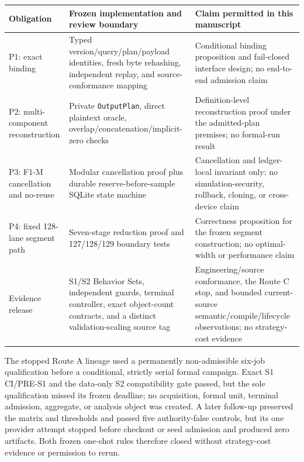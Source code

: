 {\small{} %
\begin{longtable}[]{@{}
  >{\raggedright\arraybackslash}p{}
  >{\raggedright\arraybackslash}p{}
  >{\raggedright\arraybackslash}p{}@{}}
\toprule\noalign{}
\begin{minipage}[b]{\linewidth}\raggedright
Obligation
\end{minipage} & \begin{minipage}[b]{\linewidth}\raggedright
Frozen implementation and review boundary
\end{minipage} & \begin{minipage}[b]{\linewidth}\raggedright
Claim permitted in this manuscript
\end{minipage} \\
\midrule\noalign{}
\endhead
\bottomrule\noalign{}
\endlastfoot
P1: exact binding & Typed version/query/plan/payload identities, fresh byte rehashing, independent replay, and source-conformance mapping & Conditional binding proposition and fail-closed interface design; no end-to-end admission claim \\
P2: multi-component reconstruction & Private \texttt{Output}\allowbreak\texttt{Plan}, direct plaintext oracle, overlap/\allowbreak concatenation/\allowbreak implicit-zero checks & Definition-level reconstruction proof under the admitted-plan premises; no formal-run result \\
P3: F1-M cancellation and no-reuse & Modular cancellation proof plus durable reserve-before-sample SQLite state machine & Cancellation and ledger-local invariant only; no simulation-security, rollback, cloning, or cross-device claim \\
P4: fixed 128-lane segment path & Seven-stage reduction proof and 127/128/129 boundary tests & Correctness proposition for the frozen segment construction; no optimal-width or performance claim \\
Evidence release & S1/S2 Behavior Sets, independent guards, terminal controller, exact object-count contracts, and a distinct validation-scaling source tag & Engineering/source conformance, the Route C stop, and bounded current-source semantic/compile/lifecycle observations; no strategy-cost evidence \\
\end{longtable}
}

The stopped Route A lineage used a permanently non-admissible six-job
qualification before a conditional, strictly serial formal campaign. Exact S1
CI/PRE-S1 and the data-only S2 compatibility gate passed, but the sole
qualification missed its frozen deadline; no acquisition, formal unit,
terminal admission, aggregate, or analysis object was created. A later
follow-up preserved the matrix and thresholds and passed five authority-false
controls, but its one provider attempt stopped before checkout or seed
admission and produced zero artifacts. Both frozen one-shot rules therefore
closed without strategy-cost evidence or permission to rerun.

